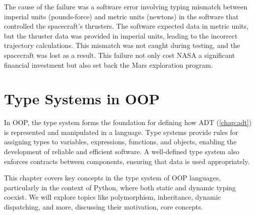 \documentclass[oneside,11pt,dvipsnames]{book}
\begin{document}
The cause of the failure was a software error involving typing mismatch between imperial units (pounds-force) and metric units (newtons) in the software that controlled the spacecraft's thrusters. The software expected data in metric units, but the thruster data was provided in imperial units, leading to the incorrect trajectory calculations. This mismatch was not caught during testing, and the spacecraft was lost as a result. This failure not only cost NASA a significant financial investment but also set back the Mars exploration program. 


\section{Type Systems in OOP}

In OOP, the type system forms the foundation for defining how ADT (\autoref{chap:adt}) is represented and manipulated in a language. Type systems provide rules for assigning types to variables, expressions, functions, and objects, enabling the development of reliable and efficient software. A well-defined type system also enforces contracts between components, ensuring that data is used appropriately.

This chapter covers key concepts in the type system of OOP languages, particularly in the context of Python, where both static and dynamic typing coexist. We will explore topics like polymorphism, inheritance, dynamic dispatching, and more, discussing their motivation, core concepts. 





\end{document}
